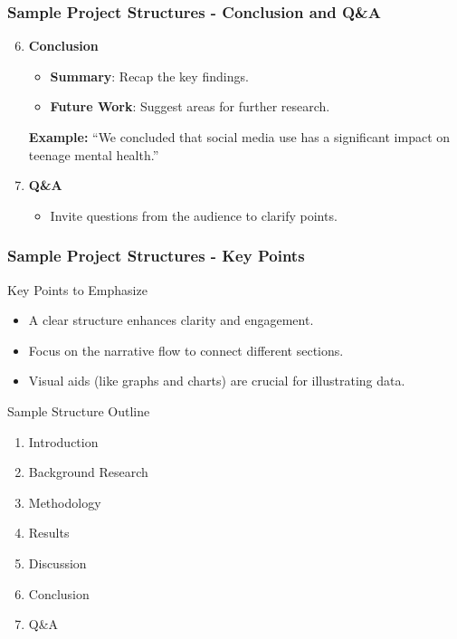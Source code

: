 \documentclass[aspectratio=169]{beamer}
\begin{document}
\begin{frame}[fragile]
    \frametitle{Sample Project Structures - Conclusion and Q\&A}
    \begin{enumerate}
        \setcounter{enumi}{5} %
        \item \textbf{Conclusion}
        \begin{itemize}
            \item \textbf{Summary}: Recap the key findings.
            \item \textbf{Future Work}: Suggest areas for further research.
        \end{itemize}
        \textbf{Example:} “We concluded that social media use has a significant impact on teenage mental health.”
        
        \item \textbf{Q\&A}
        \begin{itemize}
            \item Invite questions from the audience to clarify points.
        \end{itemize}
    \end{enumerate}
\end{frame}

\begin{frame}[fragile]
    \frametitle{Sample Project Structures - Key Points}
    \begin{block}{Key Points to Emphasize}
        \begin{itemize}
            \item A clear structure enhances clarity and engagement.
            \item Focus on the narrative flow to connect different sections.
            \item Visual aids (like graphs and charts) are crucial for illustrating data.
        \end{itemize}
    \end{block}
    \begin{block}{Sample Structure Outline}
        \begin{enumerate}
            \item Introduction
            \item Background Research
            \item Methodology
            \item Results
            \item Discussion
            \item Conclusion
            \item Q\&A
        \end{enumerate}
    \end{block}
\end{frame}
\end{document}
